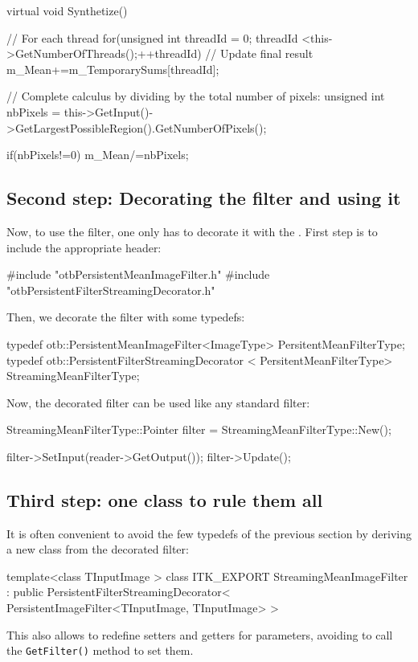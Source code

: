 \begin{cppcode}
virtual void Synthetize()
{
// For each thread
for(unsigned int threadId = 0; threadId <this->GetNumberOfThreads();++threadId)
  {
  // Update final result
  m_Mean+=m_TemporarySums[threadId];
} 

// Complete calculus by dividing by the total number of pixels:
unsigned int nbPixels =
this->GetInput()->GetLargestPossibleRegion().GetNumberOfPixels();

if(nbPixels!=0)
  {
  m_Mean/=nbPixels;
  }  
}
\end{cppcode}

\subsection{Second step: Decorating the filter and using it}

Now, to use the filter, one only has to decorate it with the
. First step is
to include the appropriate header:

\begin{cppcode}
#include "otbPersistentMeanImageFilter.h"
#include "otbPersistentFilterStreamingDecorator.h"
\end{cppcode}

Then, we decorate the filter with some typedefs:

\begin{cppcode}
typedef otb::PersistentMeanImageFilter<ImageType>
  PersitentMeanFilterType;
typedef otb::PersistentFilterStreamingDecorator
  < PersitentMeanFilterType> StreamingMeanFilterType;
\end{cppcode}

Now, the decorated filter can be used like any standard filter:

\begin{cppcode}
StreamingMeanFilterType::Pointer filter =
  StreamingMeanFilterType::New();

filter->SetInput(reader->GetOutput());
filter->Update();
\end{cppcode}

\subsection{Third step: one class to rule them all}

It is often convenient to avoid the few typedefs of the previous
section by deriving a new class from the decorated filter:

\begin{cppcode}
template<class TInputImage >
  class ITK_EXPORT StreamingMeanImageFilter :
    public PersistentFilterStreamingDecorator<
           PersistentImageFilter<TInputImage, TInputImage> >
\end{cppcode}

This also allows to redefine setters and getters for parameters,
avoiding to call the \verb?GetFilter()? method to set them.
